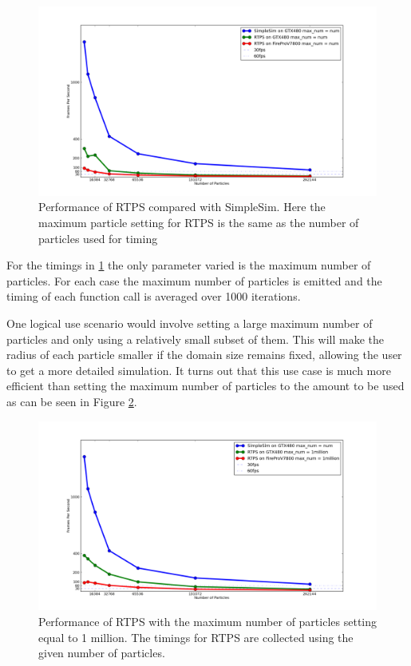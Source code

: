 \begin{figure}[!htc]
 		\centering
        \includegraphics[scale=0.45]{figures/maxnum_eq_num_fps.png}
        \caption{ {\footnotesize Performance of RTPS compared with SimpleSim. Here the maximum
        particle setting for RTPS is the same as the number of particles used
        for timing}}
        \label{fig:fps_num}
\end{figure}


For the timings in \ref{fig:fps_num} the only parameter varied is the maximum number of particles.
For each case the maximum number of particles is emitted and the timing of each
function call is averaged over 1000 iterations.


One logical use scenario would involve setting a large maximum number of
particles and only using a relatively small subset of them. This will make the
radius of each particle smaller if the domain size remains fixed, allowing the
user to get a more detailed simulation. It turns out that this use case is much
more efficient than setting the maximum number of particles to the amount to be
used as can be seen in Figure \ref{fig:fps_1mill}.


\begin{figure}[!htc]
 		\centering
        \includegraphics[scale=0.45]{figures/maxnum_eq_1mill_fps.png}
        \caption{ {\small Performance of RTPS with the maximum number of particles
        setting equal to 1 million. The timings for RTPS are collected using
        the given number of particles.}}
        \label{fig:fps_1mill}
\end{figure}


